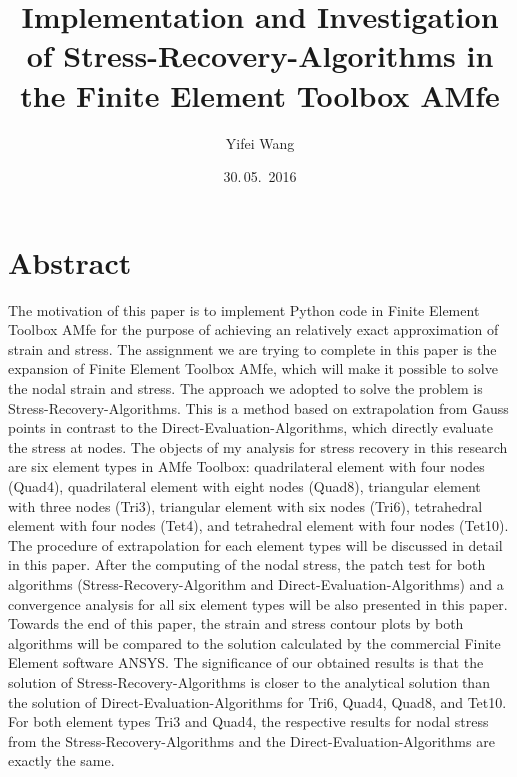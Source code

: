 \documentclass[nenglish]{AMsemesterArbeit}
\author{Yifei Wang}
\title{%
	Implementation and Investigation of Stress-Recovery-Algorithms in the Finite Element Toolbox AMfe
	}
\date{30.\,05.~2016}
\begin{document}
\renewcommand{\arraystretch}{2.5}
\frontmatter
\maketitle
\section*{Abstract}
The motivation of this paper is to implement Python code in Finite Element Toolbox AMfe for the purpose of achieving an relatively exact approximation of strain and stress. The assignment we are trying to complete in this paper is the expansion of Finite Element Toolbox AMfe, which will make it possible to solve the nodal strain and stress. The approach we adopted to solve the problem is Stress-Recovery-Algorithms. This is a method based on extrapolation from Gauss points in contrast to the Direct-Evaluation-Algorithms, which directly evaluate the stress at nodes. The objects of my analysis for stress recovery in this research are six element types in AMfe Toolbox: quadrilateral element with four nodes (Quad4), quadrilateral element with eight nodes (Quad8), triangular element with three nodes (Tri3), triangular element with six nodes (Tri6), tetrahedral element with four nodes (Tet4), and tetrahedral element with four nodes (Tet10). The procedure of extrapolation for each element types will be discussed in detail in this paper. After the computing of the nodal stress, the patch test for both algorithms (Stress-Recovery-Algorithm and Direct-Evaluation-Algorithms) and a convergence analysis for all six element types will be also presented in this paper. Towards the end of this paper, the strain and stress contour plots by both algorithms will be compared to the solution calculated by the commercial Finite Element software ANSYS. The significance of our obtained results is that the solution of Stress-Recovery-Algorithms is closer to the analytical solution than the solution of Direct-Evaluation-Algorithms for Tri6, Quad4, Quad8, and Tet10. For both element types Tri3 and Quad4, the respective results for nodal stress from the Stress-Recovery-Algorithms and the Direct-Evaluation-Algorithms are exactly the same.



\PrintTablesAndListsOfContents
\mainmatter

\backmatter
\AMPrintBibliography
\end{document}
